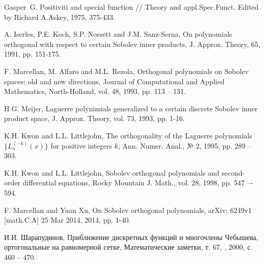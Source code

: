 \begin{thebibliography}{999}

 Gasper~G. Positiviti and special function // Theory and appl.Spec.Funct. Edited by Richard A.Askey, 1975, 375-433.







A. Iserles, P.E. Koch, S.P. Norsett and J.M. Sanz-Serna,
On polynomials  orthogonal  with respect  to certain Sobolev inner products,
J. Approx. Theory, 65, 1991, pp. 151-175.







F. Marcellan, M. Alfaro and M.L. Rezola,
Orthogonal polynomials on Sobolev spaces: old and new directions,
Journal of Computational and Applied Mathematics, North-Holland, vol. 48, 1993, pp. 113 -- 131.







H.G. Meijer,
Laguerre polynimials generalized to a certain discrete Sobolev inner product space,
J. Approx. Theory, vol. 73, 1993, pp. 1-16.






K.H. Kwon and L.L. Littlejohn,
The orthogonality of the Laguerre polynomials $\{L_n^{(-k)}(x)\}$ for positive integers $k$,
Ann. Numer. Anal., № 2, 1995, pp. 289 -- 303.





 K.H. Kwon and L.L. Littlejohn,
Sobolev orthogonal polynomials and second-order differential equations, Rocky Mountain J. Math.,
vol. 28, 1998, pp. 547 –- 594.





F. Marcellan and Yuan Xu,
On Sobolev orthogonal polynomials,
arXiv: 6249v1 [math.C.A] 25 Mar 2014, 2014, pp. 1-40.





 И.И. Шарапудинов,
Приближение дискретных функций и многочлены Чебышева, ортогональные на равномерной сетке,
Математические заметки, т. 67, , 2000, с. 460 -- 470.




\end{thebibliography}
